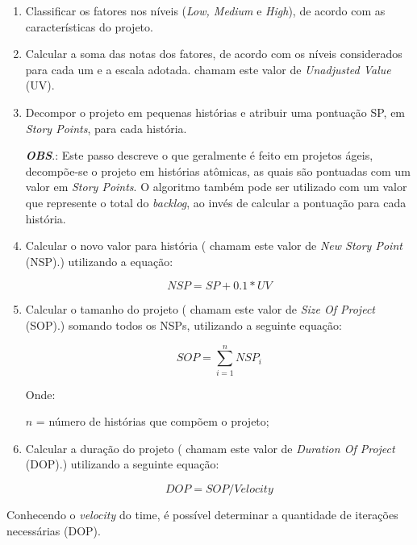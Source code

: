     \begin{enumerate}
     
     \item Classificar os fatores nos níveis (\textit{Low, Medium} e \textit{High}), de acordo com as características do projeto.
     
     \item Calcular a soma das notas dos fatores, de acordo com os níveis considerados para cada um e a escala adotada.
	    chamam este valor de \textit{Unadjusted Value} (UV).
	   
     \item Decompor o projeto em pequenas histórias e atribuir uma pontuação SP, em \textit{Story Points}, para cada história.
	
	\subitem \textbf{\textit{OBS}}.: Este passo descreve o que geralmente é feito em projetos ágeis, decompõe-se o projeto
		  em histórias atômicas, as quais são pontuadas com um valor em \textit{Story Points}.
		  O algoritmo também pode ser utilizado com um valor que represente o total do \textit{backlog}, ao invés de 
		  calcular a pontuação para cada história.
     
     \item Calcular o novo valor para história 
	   ( chamam este valor de \textit{New Story Point} (NSP).) utilizando a equação:
     
	    $$ NSP = SP + 0.1*UV $$
	    
     \item Calcular o tamanho do projeto ( chamam este valor de \textit{Size Of Project} (SOP).)
	   somando todos os NSPs, utilizando a seguinte equação:
     
	    $$ SOP = \sum\limits_{i=1}^{n}NSP_i $$
	    
	    Onde:
	    
	    $n$ = número de histórias que compõem o projeto;
	    
     \item Calcular a duração do projeto ( chamam este valor de \textit{Duration Of Project} (DOP).)
	   utilizando a seguinte equação:
	   
	   $$ DOP = SOP/Velocity $$

    \end{enumerate}
    
    Conhecendo o \textit{velocity} do time, é possível determinar a quantidade de iterações necessárias (DOP).
    